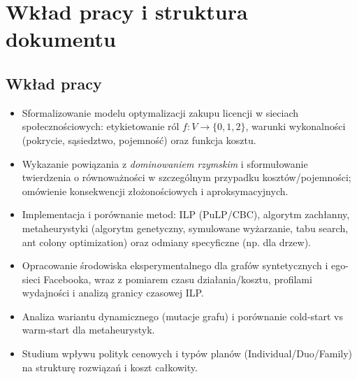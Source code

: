 \section{Wkład pracy i struktura dokumentu}
\subsection*{Wkład pracy}
\begin{itemize}
  \item Sformalizowanie modelu optymalizacji zakupu licencji w sieciach społecznościowych: etykietowanie ról $f:V\to\{0,1,2\}$, warunki wykonalności (pokrycie, sąsiedztwo, pojemność) oraz funkcja kosztu.
  \item Wykazanie powiązania z \emph{dominowaniem rzymskim} i sformułowanie twierdzenia o równoważności w szczególnym przypadku kosztów/pojemności; omówienie konsekwencji złożonościowych i aproksymacyjnych.
  \item Implementacja i porównanie metod: ILP (PuLP/CBC), algorytm zachłanny, metaheurystyki (algorytm genetyczny, symulowane wyżarzanie, tabu search, ant colony optimization) oraz odmiany specyficzne (np. dla drzew).
  \item Opracowanie środowiska eksperymentalnego dla grafów syntetycznych i ego-sieci Facebooka, wraz z pomiarem czasu działania/kosztu, profilami wydajności i analizą granicy czasowej ILP.
  \item Analiza wariantu dynamicznego (mutacje grafu) i porównanie cold-start vs warm-start dla metaheurystyk.
  \item Studium wpływu polityk cenowych i typów planów (Individual/Duo/Family) na strukturę rozwiązań i koszt całkowity.
\end{itemize}

